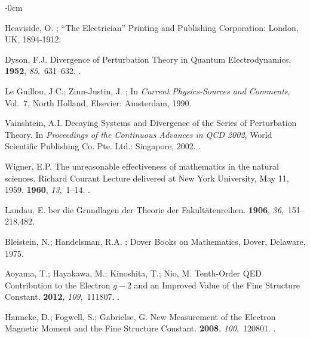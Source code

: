 \documentclass[axioms,article,accept,oneauthor,pdftex]{Definitions/mdpi}
\begin{document}
\begin{adjustwidth}{-\extralength}{0cm}
\begin{thebibliography}{999}
Heaviside, O.
; ``The Electrician'' Printing and
  Publishing Corporation: London, UK,  1894-1912.

Dyson, F.J.
\newblock Divergence of Perturbation Theory in Quantum Electrodynamics.
 {\bf 1952}, {\em 85},~631--632.
.

{Le Guillou}, J.C.; Zinn-Justin, J.
; In {\em
  Current Physics-Sources and Comments},  Vol.~7, North Holland, Elsevier: Amsterdam,
1990.


Vainshtein, A.I.
\newblock Decaying Systems and Divergence of the Series of Perturbation Theory.
\newblock In {\em Proceedings of the Continuous Advances in {QCD} 2002}, World
  Scientific Publishing Co. Pte. Ltd.: Singapore,  2002.
.

Wigner, E.P.
\newblock The unreasonable effectiveness of mathematics in the natural
  sciences. {R}ichard {C}ourant {L}ecture delivered at {N}ew {Y}ork
  {U}niversity, {M}ay 11, 1959.
 {\bf 1960}, {\em
  13},~1--14.
.

Landau, E.
ber die {G}rundlagen der {T}heorie der {F}akult\"atenreihen.
  {\bf 1906}, {\em 36},~151--218,482.

Bleistein, N.; Handelsman, R.A.
; Dover Books on Mathematics,
  Dover, Delaware,
1975.

Aoyama, T.; Hayakawa, M.; Kinoshita, T.; Nio, M.
\newblock Tenth-Order {QED} Contribution to the Electron $g-2$ and an Improved
  Value of the Fine Structure Constant.
 {\bf 2012}, {\em 109},~111807.
.

Hanneke, D.; Fogwell, S.; Gabrielse, G.
\newblock New Measurement of the Electron Magnetic Moment and the Fine
  Structure Constant.
 {\bf 2008}, {\em 100},~120801.
.


\end{thebibliography}
\end{adjustwidth}
\end{document}
